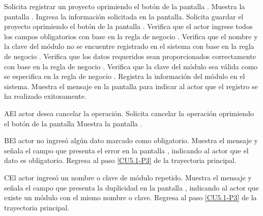 	\begin{UCtrayectoria}
		\UCpaso[\UCactor] Solicita registrar un proyecto oprimiendo el botón  de la pantalla .
		\UCpaso[\UCsist] Muestra la pantalla .
		\UCpaso[\UCactor] Ingresa la información solicitada en la pantalla. \label{CU5.1-P3}
		\UCpaso[\UCactor] Solicita guardar el proyecto oprimiendo el botón  de la pantalla . 
		\UCpaso[\UCsist] Verifica que el actor ingrese todos los campos obligatorios con base en la regla de negocio . 
		\UCpaso[\UCsist] Verifica que el nombre y la clave del módulo no se encuentre registrado en el sistema con base en la regla de negocio . 
		\UCpaso[\UCsist] Verifica que los datos requeridos sean proporcionados correctamente con base en la regla de negocio .  
		\UCpaso[\UCsist] Verifica que la clave del módulo sea válida como se especifica en la regla de negocio . 
		\UCpaso[\UCsist] Registra la información del módulo en el sistema.
		\UCpaso[\UCsist] Muestra el mensaje  en la pantalla  para indicar al actor que el registro se ha realizado exitosamente.
	\end{UCtrayectoria}		
	
	\begin{UCtrayectoriaA}{A}{El actor desea cancelar la operación.}
		\UCpaso[\UCactor] Solicita cancelar la operación oprimiendo el botón  de la pantalla 
		\UCpaso[\UCsist] Muestra la pantalla .
	\end{UCtrayectoriaA}

	\begin{UCtrayectoriaA}{B}{El actor no ingresó algún dato marcado como obligatorio.}
		\UCpaso[\UCsist] Muestra el mensaje  y señala el campo que presenta el error en la pantalla , indicando al actor que el dato es obligatorio.
		\UCpaso Regresa al paso \ref{CU5.1-P3} de la trayectoria principal.
	\end{UCtrayectoriaA}
	
	\begin{UCtrayectoriaA}{C}{El actor ingresó un nombre o clave de módulo repetido.}
		\UCpaso[\UCsist] Muestra el mensaje  y señala el campo que presenta la duplicidad en la pantalla , indicando al actor que existe un módulo con el mismo nombre o clave.
		\UCpaso Regresa al paso \ref{CU5.1-P3} de la trayectoria principal.
	\end{UCtrayectoriaA}

